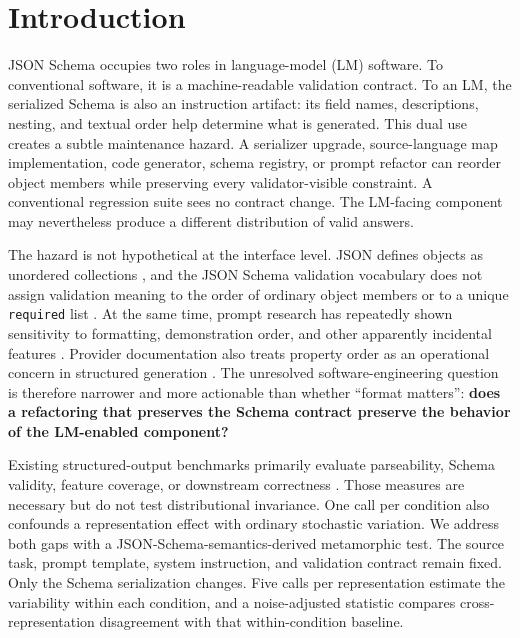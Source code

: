\documentclass[11pt,a4paper]{article}
\begin{document}
\section{Introduction}
JSON Schema occupies two roles in language-model (LM) software. To conventional software, it is a machine-readable validation contract. To an LM, the serialized Schema is also an instruction artifact: its field names, descriptions, nesting, and textual order help determine what is generated. This dual use creates a subtle maintenance hazard. A serializer upgrade, source-language map implementation, code generator, schema registry, or prompt refactor can reorder object members while preserving every validator-visible constraint. A conventional regression suite sees no contract change. The LM-facing component may nevertheless produce a different distribution of valid answers.

The hazard is not hypothetical at the interface level. JSON defines objects as unordered collections \citep{rfc8259}, and the JSON Schema validation vocabulary does not assign validation meaning to the order of ordinary object members or to a unique \texttt{required} list \citep{jsonschema2020validation}. At the same time, prompt research has repeatedly shown sensitivity to formatting, demonstration order, and other apparently incidental features \citep{lu2022ordered,sclar2024format,kang2025format,hua2025artifact}. Provider documentation also treats property order as an operational concern in structured generation \citep{google2026propertyorder}. The unresolved software-engineering question is therefore narrower and more actionable than whether ``format matters'': \textbf{does a refactoring that preserves the Schema contract preserve the behavior of the LM-enabled component?}

Existing structured-output benchmarks primarily evaluate parseability, Schema validity, feature coverage, or downstream correctness \citep{geng2025jsonschemabench,lu2025schemarl,singh2026sob}. Those measures are necessary but do not test distributional invariance. One call per condition also confounds a representation effect with ordinary stochastic variation. We address both gaps with a JSON-Schema-semantics-derived metamorphic test. The source task, prompt template, system instruction, and validation contract remain fixed. Only the Schema serialization changes. Five calls per representation estimate the variability within each condition, and a noise-adjusted statistic compares cross-representation disagreement with that within-condition baseline.
\end{document}
